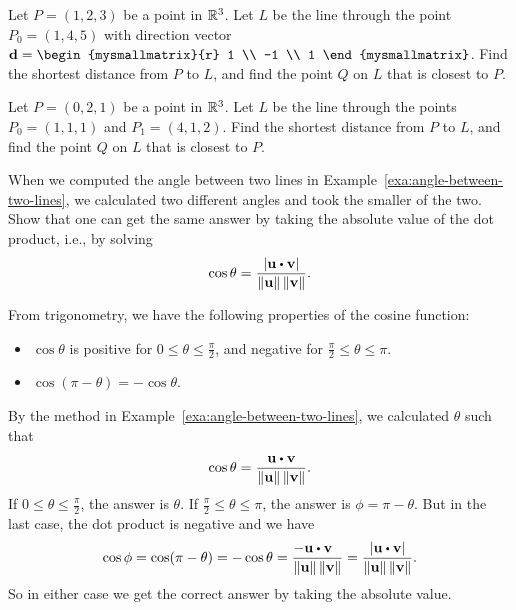 \begin{ex} Let $P = (1,2,3)$ be a point in $\mathbb{R}^3$. Let $L$ be the line
  through the point $P_0 = (1, 4, 5)$ with direction vector
  $\vect{d} = \begin{mysmallmatrix}{r} 1 \\ -1 \\
    1 \end{mysmallmatrix}$. Find the shortest distance from $P$ to
  $L$, and find the point $Q$ on $L$ that is closest to $P$.
\end{ex}

\begin{ex} Let $P = (0,2,1)$ be a point in $\mathbb{R}^3$. Let $L$ be the line through the points $P_0 = (1, 1, 1)$ and $P_1 = (4, 1, 2)$. Find the shortest distance from $P$ to $L$, and find the point $Q$ on $L$ that is closest to $P$. 
\end{ex}

\begin{ex}\label{ex:angle-lines}
  When we computed the angle between two lines in
  Example~\ref{exa:angle-between-two-lines}, we calculated two
  different angles and took the smaller of the two. Show that one can
  get the same answer by taking the absolute value of the dot product,
  i.e., by solving
  \begin{equation*}
    \cos\theta =
    \frac{\abs{\vect{u}\dotprod\vect{v}}}{\norm{\vect{u}}\norm{\vect{v}}}.
  \end{equation*}
  \begin{sol}
    From trigonometry, we have the following properties of the cosine
    function:
    \begin{itemize}
    \item $\cos\theta$ is positive for $0\leq\theta\leq\frac{\pi}{2}$,
      and negative for $\frac{\pi}{2}\leq\theta\leq\pi$. 
    \item $\cos(\pi-\theta) = -\cos\theta$.
    \end{itemize}
    By the method in Example~\ref{exa:angle-between-two-lines}, we
    calculated $\theta$ such that
    \begin{equation*}
      \cos\theta =
      \frac{\vect{u}\dotprod\vect{v}}{\norm{\vect{u}}\norm{\vect{v}}}.
    \end{equation*}
    If $0\leq\theta\leq\frac{\pi}{2}$, the answer is $\theta$. If
    $\frac{\pi}{2}\leq\theta\leq\pi$, the answer is $\phi=\pi-\theta$.
    But in the last case, the dot product is negative and we have
    \begin{equation*}
      \cos\phi = \cos(\pi-\theta) = -\cos\theta = \frac{-\vect{u}\dotprod\vect{v}~~}{\norm{\vect{u}}\norm{\vect{v}}}
      =
      \frac{\abs{\vect{u}\dotprod\vect{v}}}{\norm{\vect{u}}\norm{\vect{v}}}.
    \end{equation*}
    So in either case we get the correct answer by taking the absolute
    value. 
  \end{sol}
\end{ex}

